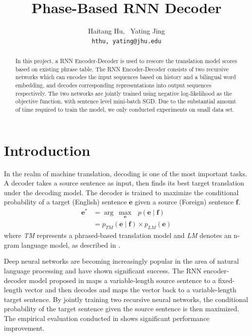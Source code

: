 \documentclass[11pt,letterpaper]{article}
\title{\huge Phase-Based RNN Decoder}
\author{Haitang Hu, \ Yating Jing\\
  \tt hthu,\,yating@jhu.edu}
\date{}
\begin{document}
\maketitle

\begin{abstract}
In this project, a RNN Encoder-Decoder is used to rescore the translation model scores based on existing phrase table. The RNN Encoder-Decoder consists of two recursive networks which can encodes the input sequences based on history and a bilingual word embedding, and decodes corresponding representations into output sequences respectively. The two networks are jointly trained using negative log-likelihood as the objective function, with sentence level mini-batch SGD. Due to the substantial amount of time required to train the model, we only conducted experiments on small data set.
\end{abstract}

\section{Introduction}
In the realm of machine translation, decoding is one of the most important tasks. A decoder takes a source sentence as input, then finds its best target translation under the decoding model. The decoder is trained to maximize the conditional probability of a target (English) sentence $\mathbf{e}$ given a source (Foreign) sentence $\mathbf{f}$. 
\begin{equation}
\begin{split}
\mathbf{e^*} &= \arg \ \underset{\mathbf{e}}{\max}\text{ } p(\mathbf{e}\mid \mathbf{f}) \\
&=  p_{TM}(\mathbf{e}\mid \mathbf{f}) \times p_{LM}(\mathbf{e})
\end{split}
\end{equation}
where \textit{TM} represents a phrased-based translation model and \textit{LM} denotes an n-gram language model, as described in \cite{phi}. 

Deep neural networks are becoming increasingly popular in the area of natural language processing and have shown significant success. The RNN encoder-decoder model proposed in \cite{rnn} maps a variable-length source sentence to a fixed-length vector and then decodes and maps the vector back to a variable-length target sentence. By jointly training two recursive neural networks, the conditional probability of the target sentence given the source sentence is then maximized. The empirical evaluation conducted in \cite{rnn} shows significant performance improvement. 
\end{document}
